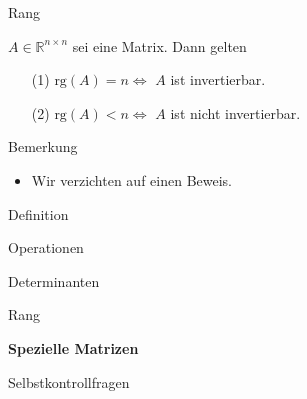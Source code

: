 \documentclass[
  8pt,
  ignorenonframetext,
]{beamer}
\providecommand{\tightlist}{%
  \setlength{\itemsep}{0pt}\setlength{\parskip}{0pt}}
\begin{document}
\begin{frame}{Rang}
\protect\hypertarget{rang-3}{}
\small
\begin{theorem}
\justifying
\normalfont
$A \in \mathbb{R}^{n \times n}$ sei eine Matrix. Dann gelten

\begin{itemize}
\item[(1)] $\mbox{rg}(A) = n \Leftrightarrow$ $A$ ist invertierbar.
\item[(2)] $\mbox{rg}(A) < n \Leftrightarrow$ $A$ ist nicht invertierbar.
\end{itemize}
\end{theorem}

\footnotesize

Bemerkung

\begin{itemize}
\tightlist
\item
  Wir verzichten auf einen Beweis.
\end{itemize}
\end{frame}

\begin{frame}{}
\protect\hypertarget{section-7}{}
\large
{}
\vfill

Definition

Operationen

Determinanten

Rang

\textbf{Spezielle Matrizen}

Selbstkontrollfragen \vfill
\end{frame}
\end{document}
